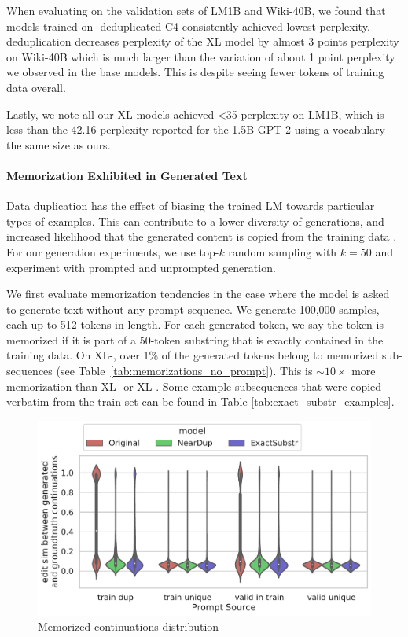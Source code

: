 When evaluating on the validation sets of LM1B and Wiki-40B, we found that models trained on \Approx-deduplicated C4 consistently achieved lowest perplexity.
\Exact{} deduplication decreases perplexity of the XL model by almost 3 points perplexity on Wiki-40B which is much larger than the variation of about 1 point perplexity we observed in the base models.
This is despite seeing fewer tokens of training data overall.

Lastly, we note all our XL models achieved  <35 perplexity on LM1B, which is less than the 42.16 perplexity reported for the 1.5B GPT-2 using a vocabulary the same size as ours.


\paragraph{Memorization Exhibited in Generated Text}
\label{sec:memorization-results}
Data duplication has the effect of biasing the trained LM towards particular types of examples. 
This can contribute to a lower diversity of generations, and increased likelihood that the generated content is copied from the training data \citep{carlini2020extracting}.
For our generation experiments, we use top-$k$ random sampling with $k=50$ and experiment with prompted and unprompted generation.


We first evaluate memorization tendencies in the case where the model is asked to generate text without any prompt sequence.
We generate 100,000 samples, each up to 512 tokens in length.
For each generated token, we say the token is memorized if it is part of a 50-token substring that is exactly contained in the training data.
On XL-\Original, over 1\% of the generated tokens belong to memorized sub-sequences (see Table~\ref{tab:memorizations_no_prompt}).
This is $\sim10\times$ more memorization than XL-\Exact{} or XL-\Approx.
Some example subsequences that were copied verbatim from the train set can be found in Table \ref{tab:exact_substr_examples}.



\begin{figure}[h]
    \centering
    \includegraphics[width=0.5\linewidth]{figures/memorized_continuations_distribution.pdf}
    \caption{Memorized continuations distribution}
    \label{fig:mem-cont-dist}
\end{figure}

